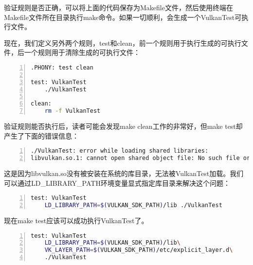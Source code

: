 \documentclass{ctexart}
\begin{document}
验证规则是否正确，可以将上面的代码保存为Makefile文件，然后使用终端在Makefile文件所在目录执行make命令。如果一切顺利，会生成一个VulkanTest可执行文件。

现在，我们定义另外两个规则，test和clean，前一个规则用于执行生成的可执行文件，后一个规则用于清除生成的可执行文件：

\begin{lstlisting}[language={bash},keywordstyle=\color{blue!70},commentstyle=\color{red!50!green!50!blue!50},frame=shadowbox, rulesepcolor=\color{red!20!green!20!blue!20},basicstyle=\small,numbers=left, numberstyle=\tiny,breaklines=true]
.PHONY: test clean

test: VulkanTest
	./VulkanTest

clean:
	rm -f VulkanTest
\end{lstlisting}

验证规则能否执行后，读者可能会发现make clean工作的非常好，但make test却产生了下面的错误信息：

\begin{lstlisting}[language={bash},keywordstyle=\color{blue!70},commentstyle=\color{red!50!green!50!blue!50},frame=shadowbox, rulesepcolor=\color{red!20!green!20!blue!20},basicstyle=\small,numbers=left, numberstyle=\tiny,breaklines=true]
./VulkanTest: error while loading shared libraries:
libvulkan.so.1: cannot open shared object file: No such file or directory
\end{lstlisting}

这是因为libvulkan.so没有被安装在系统的库目录，无法被VulkanTest加载。我们可以通过LD\_LIBRARY\_PATH环境变量显式指定库目录来解决这个问题：

\begin{lstlisting}[language={bash},keywordstyle=\color{blue!70},commentstyle=\color{red!50!green!50!blue!50},frame=shadowbox, rulesepcolor=\color{red!20!green!20!blue!20},basicstyle=\small,numbers=left, numberstyle=\tiny,breaklines=true]
test: VulkanTest
	LD_LIBRARY_PATH=$(VULKAN_SDK_PATH)/lib ./VulkanTest
\end{lstlisting}

现在make test应该可以成功执行VulkanTest了。

\begin{lstlisting}[language={bash},keywordstyle=\color{blue!70},commentstyle=\color{red!50!green!50!blue!50},frame=shadowbox, rulesepcolor=\color{red!20!green!20!blue!20},basicstyle=\small,numbers=left, numberstyle=\tiny,breaklines=true]
test: VulkanTest
	LD_LIBRARY_PATH=$(VULKAN_SDK_PATH)/lib\
	VK_LAYER_PATH=$(VULKAN_SDK_PATH)/etc/explicit_layer.d\
	./VulkanTest
\end{lstlisting}
\end{document}
